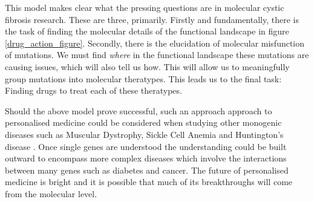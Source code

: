 This model makes clear what the pressing questions are in molecular cystic fibrosis research. These are three, primarily. Firstly and fundamentally, there is the task of finding the molecular details of the functional landscape in figure \ref{drug_action_figure}. Secondly, there is the elucidation of molecular misfunction of mutations. We must find \textit {where} in the functional landscape these mutations are causing issues, which will also tell us how. This will allow us to meaningfully group mutations into molecular theratypes. This leads us to the final task: Finding drugs to treat each of these theratypes. 

Should the above model prove successful, such an approach approach to personalised medicine could  be considered when studying other monogenic diseases such as Muscular  Dystrophy, Sickle Cell Anemia and Huntington's disease \cite{}. Once single genes are understood the understanding could be built outward to encompass more complex diseases which involve the interactions between many genes such as diabetes and cancer. The future of personalised medicine is bright and it is possible that much of its breakthroughs will come from the molecular level.
